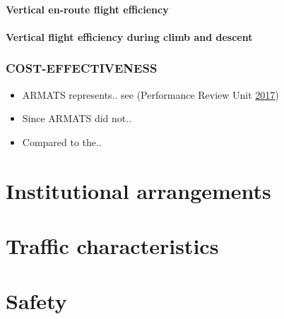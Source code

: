 \documentclass[]{book}
\begin{document}
\hypertarget{vertical-en-route-flight-efficiency}{%
\subsubsection*{Vertical en-route flight efficiency}\label{vertical-en-route-flight-efficiency}}

\hypertarget{vertical-flight-efficiency-during-climb-and-descent}{%
\subsubsection*{Vertical flight efficiency during climb and descent}\label{vertical-flight-efficiency-during-climb-and-descent}}

\hypertarget{cost-effectiveness}{%
\subsection*{COST-EFFECTIVENESS}\label{cost-effectiveness}}

\begin{itemize}
\item
  ARMATS represents.. see (Performance Review Unit \protect\hyperlink{ref-pru:ace-report-2015}{2017})
\item
  Since ARMATS did not..
\item
  Compared to the..
\end{itemize}

\tableofcontents

\listoffigures

\hypertarget{institutional-arrangements}{%
\chapter{Institutional arrangements}\label{institutional-arrangements}}

\hypertarget{traffic-characteristics}{%
\chapter{Traffic characteristics}\label{traffic-characteristics}}

\hypertarget{safety-1}{%
\chapter{Safety}\label{safety-1}}
\end{document}
